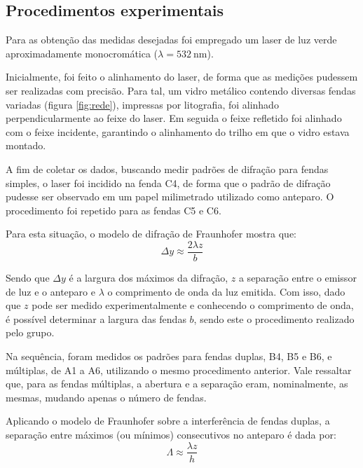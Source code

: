 \subsection{Procedimentos experimentais}

Para as obtenção das medidas desejadas foi empregado um laser de luz verde aproximadamente monocromática ($\lambda = \SI{532}{\nano\meter}$).

Inicialmente, foi feito o alinhamento do laser, de forma que as medições pudessem ser realizadas com precisão. Para tal, um vidro metálico contendo diversas fendas variadas (figura \ref{fig:rede}), impressas por litografia, foi alinhado perpendicularmente ao feixe do laser. Em seguida o feixe refletido foi alinhado com o feixe incidente, garantindo o alinhamento do trilho em que o vidro estava montado.



A fim de coletar os dados, buscando medir padrões de difração para fendas simples, o laser foi incidido na fenda C4, de forma que o padrão de difração pudesse ser observado em um papel milimetrado utilizado como anteparo. O procedimento foi repetido para as fendas C5 e C6.

Para esta situação, o modelo de difração de Fraunhofer mostra que:
\begin{equation*}
    \Delta y \approx \frac{2 \lambda z}{b} \label{eq:difr}
\end{equation*}

Sendo que $\Delta y$ é a largura dos máximos da difração, $z$ a separação entre o emissor de luz e o anteparo e $\lambda$ o comprimento de onda da luz emitida. Com isso, dado que $z$ pode ser medido experimentalmente e conhecendo o comprimento de onda, é possível determinar a largura das fendas $b$, sendo este o procedimento realizado pelo grupo.

Na sequência, foram medidos os padrões para fendas duplas, B4, B5 e B6, e múltiplas, de A1 a A6, utilizando o mesmo procedimento anterior. Vale ressaltar que, para as fendas múltiplas, a abertura e a separação eram, nominalmente, as mesmas, mudando apenas o número de fendas.

Aplicando o modelo de Fraunhofer sobre a interferência de fendas duplas, a separação entre máximos (ou mínimos) consecutivos no anteparo é dada por:
\begin{equation}
    \Lambda \approx \frac{\lambda z}{h} \label{eq:duplas}
\end{equation}

